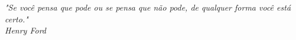 \begin{center}
\fontsize{14}{14}
\end{center}

\vspace{10cm}

\begin{flushright}
\begin{minipage}[10cm] {8.5cm}

  \emph {"Se voc\^{e} pensa que pode ou se pensa que n\~{a}o pode, de qualquer forma voc\^{e} est\'{a} certo."
	\\Henry Ford}

\end{minipage}
\end{flushright}
